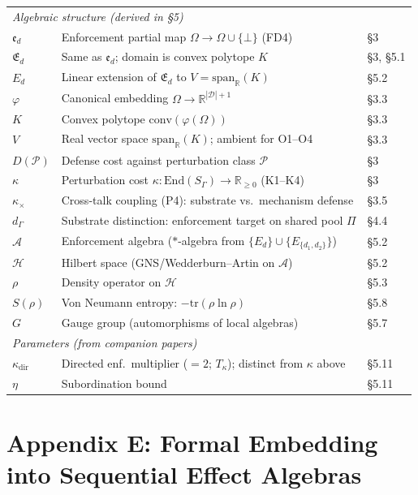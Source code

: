 \documentclass[11pt]{article}
\theoremstyle{remark}
\begin{document}
\begin{center}
\begin{tabular*}{\textwidth}{@{\extracolsep{\fill}}lll@{}}
\multicolumn{3}{l}{\textit{Algebraic structure (derived in \S5)}} \\[2pt]
$\mathfrak{e}_d$ & Enforcement partial map $\Omega \to \Omega \cup \{\bot\}$ (FD4) & \S3 \\
$\mathfrak{E}_d$ & Same as $\mathfrak{e}_d$; domain is convex polytope $K$ & \S3, \S5.1 \\
$E_d$ & Linear extension of $\mathfrak{E}_d$ to $V = \mathrm{span}_\mathbb{R}(K)$ & \S5.2 \\
$\varphi$ & Canonical embedding $\Omega \to \mathbb{R}^{|\mathcal{D}|+1}$ & \S3.3 \\
$K$ & Convex polytope $\mathrm{conv}(\varphi(\Omega))$ & \S3.3 \\
$V$ & Real vector space $\mathrm{span}_\mathbb{R}(K)$; ambient for O1--O4 & \S3.3 \\
$D(\mathcal{P})$ & Defense cost against perturbation class $\mathcal{P}$ & \S3 \\
$\kappa$ & Perturbation cost $\kappa: \mathrm{End}(S_\Gamma) \to \mathbb{R}_{\ge 0}$ (K1--K4) & \S3 \\
$\kappa_\times$ & Cross-talk coupling (P4): substrate vs.\ mechanism defense & \S3.5 \\
$d_\Gamma$ & Substrate distinction: enforcement target on shared pool $\Pi$ & \S4.4 \\
$\mathcal{A}$ & Enforcement algebra ($*$-algebra from $\{E_d\} \cup \{E_{\{d_1,d_2\}}\}$) & \S5.2 \\
$\mathcal{H}$ & Hilbert space (GNS/Wedderburn--Artin on $\mathcal{A}$) & \S5.2 \\
$\rho$ & Density operator on $\mathcal{H}$ & \S5.3 \\
$S(\rho)$ & Von Neumann entropy: $-\mathrm{tr}(\rho \ln \rho)$ & \S5.8 \\
$G$ & Gauge group (automorphisms of local algebras) & \S5.7 \\[4pt]
\multicolumn{3}{l}{\textit{Parameters (from companion papers)}} \\[2pt]
$\kappa_{\mathrm{dir}}$ & Directed enf.\ multiplier ($=2$; $T_\kappa$); distinct from $\kappa$ above & \S5.11 \\
$\eta$ & Subordination bound & \S5.11 \\
\bottomrule
\end{tabular*}
\label{tab:symbols}
\end{center}


\section*{Appendix E: Formal Embedding into Sequential Effect Algebras}
\label{app:sea}
\end{document}
